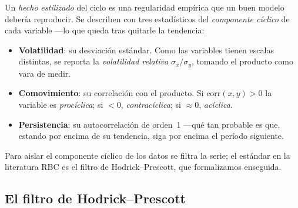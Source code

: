 \documentclass[11pt,a4paper]{report}
\begin{document}
Un \emph{hecho estilizado} del ciclo es una regularidad empírica que un buen
modelo debería reproducir. Se describen con tres estadísticos del \emph{componente
cíclico} de cada variable ---lo que queda tras quitarle la tendencia:
\begin{itemize}[nosep,leftmargin=1.4em]
\item \textbf{Volatilidad}: su desviación estándar. Como las variables tienen
  escalas distintas, se reporta la \emph{volatilidad relativa} $\sigma_x/\sigma_y$,
  tomando el producto como vara de medir.
\item \textbf{Comovimiento}: su correlación con el producto. Si
  $\mathrm{corr}(x,y)>0$ la variable es \emph{procíclica}; si $<0$,
  \emph{contracíclica}; si $\approx0$, \emph{acíclica}.
\item \textbf{Persistencia}: su autocorrelación de orden~1 ---qué tan probable es
  que, estando por encima de su tendencia, siga por encima el período siguiente.
\end{itemize}
Para aislar el componente cíclico de los datos se filtra la serie; el estándar en
la literatura RBC es el filtro de Hodrick--Prescott, que formalizamos enseguida.

\subsection{El filtro de Hodrick--Prescott}
\label{sec:hp}
\end{document}
